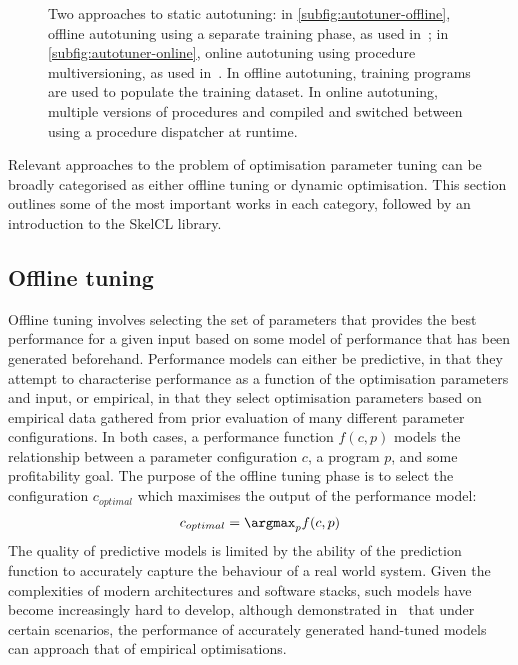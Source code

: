 \begin{figure*}[t]

\caption{Two approaches to static autotuning: in
  \ref{subfig:autotuner-offline}, offline autotuning using a separate
  training phase, as used in~\cite{Agakov, Fursin2011, Collins2013};
  in \ref{subfig:autotuner-online}, online autotuning using procedure
  multiversioning, as used in~\cite{Fursin2005}. In offline
  autotuning, training programs are used to populate the training
  dataset. In online autotuning, multiple versions of procedures and
  compiled and switched between using a procedure dispatcher at
  runtime.}
\label{fig:autotuners}
\end{figure*}

Relevant approaches to the problem of optimisation parameter tuning
can be broadly categorised as either offline tuning or dynamic
optimisation. This section outlines some of the most important works
in each category, followed by an introduction to the SkelCL library.

\subsection{Offline tuning}\label{subsec:offline-tuning}
Offline tuning involves selecting the set of parameters that provides
the best performance for a given input based on some model of
performance that has been generated beforehand. Performance models can
either be predictive, in that they attempt to characterise performance
as a function of the optimisation parameters and input, or empirical,
in that they select optimisation parameters based on empirical data
gathered from prior evaluation of many different parameter
configurations. In both cases, a performance function $f(c,p)$ models
the relationship between a parameter configuration $c$, a program $p$,
and some profitability goal. The purpose of the offline tuning phase
is to select the configuration $c_{optimal}$ which maximises the
output of the performance model:
\begin{align*}
  c_{optimal} = \argmax_{p}f(c,p)
\end{align*}
The quality of predictive models is limited by the ability of the
prediction function to accurately capture the behaviour of a real
world system. Given the complexities of modern architectures and
software stacks, such models have become increasingly hard to develop,
although \citeauthor{Yotov2003} demonstrated in~\cite{Yotov2003} that
under certain scenarios, the performance of accurately generated
hand-tuned models can approach that of empirical optimisations.

